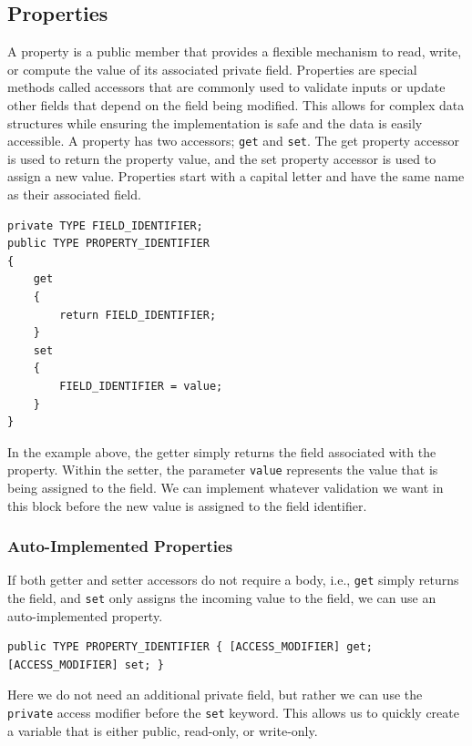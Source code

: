 \documentclass{article}
\begin{document}
\subsection{Properties}
A property is a public member that provides a flexible mechanism to
read, write, or compute the value of its associated private field.
Properties are special methods called accessors that are commonly used
to validate inputs or update other fields that depend on the field
being modified. This allows for complex data structures while ensuring
the implementation is safe and the data is easily accessible. A
property has two accessors; \texttt{get} and
\texttt{set}. The get property accessor is used to return
the property value, and the set property accessor is used to assign a
new value. Properties start with a capital letter and have the same
name as their associated field.
\begin{verbatim}
private TYPE FIELD_IDENTIFIER;
public TYPE PROPERTY_IDENTIFIER
{
    get
    {
        return FIELD_IDENTIFIER;
    }
    set
    {
        FIELD_IDENTIFIER = value;
    }
}
\end{verbatim}
In the example above, the getter simply returns the field associated
with the property. Within the setter, the parameter
\texttt{value} represents the value that is being assigned
to the field. We can implement whatever validation we want in this
block before the new value is assigned to the field identifier.
\subsubsection{Auto-Implemented Properties}
If both getter and setter accessors do not require a body, i.e.,
\texttt{get} simply returns the field, and
\texttt{set} only assigns the incoming value to the field,
we can use an auto-implemented property.
\begin{verbatim}
public TYPE PROPERTY_IDENTIFIER { [ACCESS_MODIFIER] get; [ACCESS_MODIFIER] set; }
\end{verbatim}
Here we do not need an additional private field, but rather we can use
the \texttt{private} access modifier before the
\texttt{set} keyword. This allows us to quickly create a
variable that is either public, read-only, or write-only.
\end{document}
